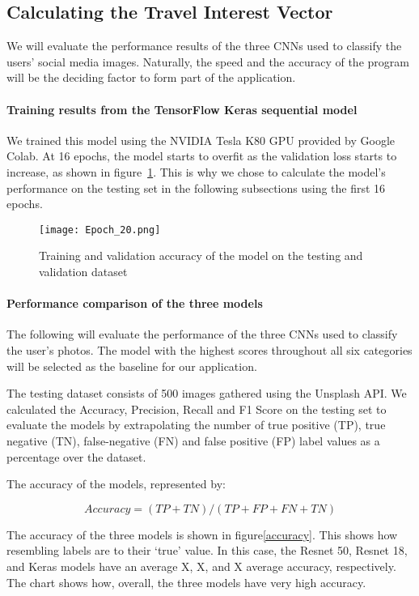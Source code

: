 \subsection{Calculating the Travel Interest Vector} 

We will evaluate the performance results of the
three CNNs used to classify the users' social media images. Naturally, the
speed and the accuracy of the program will be the deciding factor to form part
of the application.

\paragraph{Training results from the TensorFlow Keras sequential model}

We trained this model using the NVIDIA Tesla K80 GPU provided by Google Colab. At 16 epochs,
the model starts to overfit as the validation loss starts to increase, as shown
in figure~\ref{kerasresults}. This is why we chose to calculate the model's performance on the
testing set in the following subsections using the first 16 epochs. 

\begin{figure}[h]
\centering
\texttt{[image: Epoch\_20.png]}
\caption{Training and validation accuracy of the model on the testing and validation dataset}
\label{kerasresults}
\end{figure}

\paragraph{Performance comparison of the three models}

The following will evaluate the performance of the three CNNs used to classify
the user's photos. The model with the highest scores throughout all six
categories will be selected as the baseline for our application. 

The testing dataset consists of 500 images gathered using the Unsplash API. We
calculated the Accuracy, Precision, Recall and F1 Score on the testing set to
evaluate the models by extrapolating the number of true positive (TP), true
negative  (TN), false-negative (FN) and false positive (FP) label values as a
percentage over the dataset. 

The accuracy of the models, represented by:

\[Accuracy = (TP+TN) / (TP+FP+FN+TN)\]

The accuracy of the three models is shown in figure\ref{accuracy}. This shows
how resembling labels are to their `true' value. In this case, the Resnet 50,
Resnet 18, and Keras models have an average X, X, and X average accuracy,
respectively. The chart shows how, overall, the three models have very high
accuracy.

